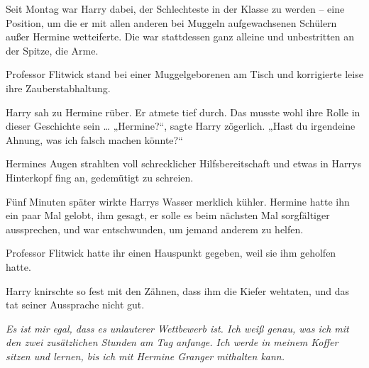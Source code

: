 Seit Montag war Harry dabei, der Schlechteste in der Klasse zu werden – eine Position, um die er mit allen anderen bei Muggeln aufgewachsenen Schülern außer Hermine wetteiferte. Die war stattdessen ganz alleine und unbestritten an der Spitze, die Arme. 

Professor Flitwick stand bei einer Muggelgeborenen am Tisch und korrigierte leise ihre Zauberstabhaltung. 

Harry sah zu Hermine rüber. Er atmete tief durch. Das musste wohl ihre Rolle in dieser Geschichte sein … „Hermine?“, sagte Harry zögerlich. „Hast du irgendeine Ahnung, was ich falsch machen könnte?“ 

Hermines Augen strahlten voll schrecklicher Hilfsbereitschaft und etwas in Harrys Hinterkopf fing an, gedemütigt zu schreien. 

Fünf Minuten später wirkte Harrys Wasser merklich kühler. Hermine hatte ihn ein paar Mal gelobt, ihm gesagt, er solle es beim nächsten Mal sorgfältiger aussprechen, und war entschwunden, um jemand anderem zu helfen. 

Professor Flitwick hatte ihr einen Hauspunkt gegeben, weil sie ihm geholfen hatte. 

Harry knirschte so fest mit den Zähnen, dass ihm die Kiefer wehtaten, und das tat seiner Aussprache nicht gut. 

\emph{Es ist mir egal, dass es unlauterer Wettbewerb ist. Ich weiß genau, was ich mit den zwei zusätzlichen Stunden am Tag anfange. Ich werde in meinem Koffer sitzen und lernen, bis ich mit Hermine Granger mithalten kann.} 

